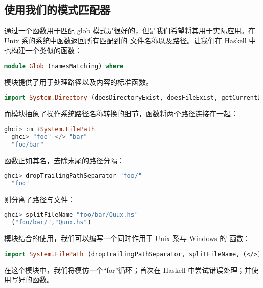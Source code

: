 \documentclass[./main.tex]{subfiles}
\begin{document}
\subsection*{使用我们的模式匹配器}

通过一个函数用于匹配 glob 模式是很好的，但是我们希望将其用于实际应用。在 Unix 系的系统中函数返回所有匹配到的
文件名称以及路径。让我们在 Haskell 中也构建一个类似的函数：

\begin{lstlisting}[language=Haskell]
  module Glob (namesMatching) where
\end{lstlisting}

模块提供了用于处理路径以及内容的标准函数。

\begin{lstlisting}[language=Haskell]
  import System.Directory (doesDirectoryExist, doesFileExist, getCurrentDirectory, getDirectoryContents)
\end{lstlisting}

而模块抽象了操作系统路径名称转换的细节，\acode{(</>)}函数将两个路径连接在一起：

\begin{lstlisting}[language=Haskell]
  ghci> :m +System.FilePath
  ghci> "foo" </> "bar"
  "foo/bar"
\end{lstlisting}

函数正如其名，去除末尾的路径分隔：

\begin{lstlisting}[language=Haskell]
  ghci> dropTrailingPathSeparator "foo/"
  "foo"
\end{lstlisting}

则分离了路径与文件：

\begin{lstlisting}[language=Haskell]
  ghci> splitFileName "foo/bar/Quux.hs"
  ("foo/bar/","Quux.hs")
\end{lstlisting}

模块结合的使用，我们可以编写一个同时作用于 Unix 系与 Windows 的
函数：

\begin{lstlisting}[language=Haskell]
  import System.FilePath (dropTrailingPathSeparator, splitFileName, (</>))
\end{lstlisting}

在这个模块中，我们将模仿一个“for”循环；首次在 Haskell 中尝试错误处理；并使用写好的函数。
\end{document}
